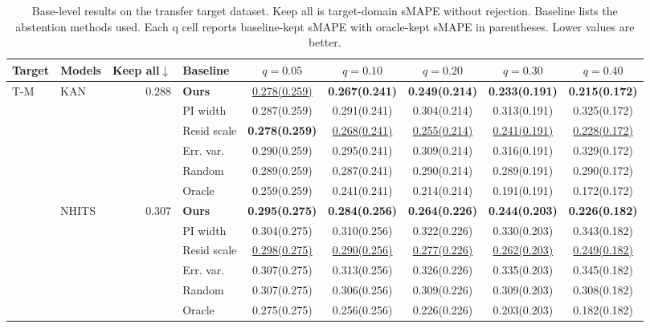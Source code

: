 \begin{table}[t]
\centering
\scriptsize
\setlength{\tabcolsep}{2pt}
\renewcommand{\arraystretch}{0.90}
\caption{Base-level results on the transfer target dataset. Keep all is target-domain sMAPE without rejection. Baseline lists the abstention methods used. Each q cell reports baseline-kept sMAPE with oracle-kept sMAPE in parentheses. Lower values are better.}
\label{tab:online-reject-option}
\begin{tabular}{@{}llrlccccc@{}}
\toprule
Target & Models & Keep all$\downarrow$ & Baseline & $q=0.05$ & $q=0.10$ & $q=0.20$ & $q=0.30$ & $q=0.40$ \\
\midrule
T-M & KAN & 0.288 & \textbf{Ours} & \underline{0.278(0.259)} & \textbf{0.267(0.241)} & \textbf{0.249(0.214)} & \textbf{0.233(0.191)} & \textbf{0.215(0.172)} \\
 &  &  & PI width & 0.287(0.259) & 0.291(0.241) & 0.304(0.214) & 0.313(0.191) & 0.325(0.172) \\
 &  &  & Resid scale & \textbf{0.278(0.259)} & \underline{0.268(0.241)} & \underline{0.255(0.214)} & \underline{0.241(0.191)} & \underline{0.228(0.172)} \\
 &  &  & Err. var. & 0.290(0.259) & 0.295(0.241) & 0.309(0.214) & 0.316(0.191) & 0.329(0.172) \\
\cmidrule(lr){4-9}
 &  &  & Random & 0.289(0.259) & 0.287(0.241) & 0.290(0.214) & 0.289(0.191) & 0.290(0.172) \\
 &  &  & Oracle & 0.259(0.259) & 0.241(0.241) & 0.214(0.214) & 0.191(0.191) & 0.172(0.172) \\
\cmidrule(lr){2-9}
 & NHITS & 0.307 & \textbf{Ours} & \textbf{0.295(0.275)} & \textbf{0.284(0.256)} & \textbf{0.264(0.226)} & \textbf{0.244(0.203)} & \textbf{0.226(0.182)} \\
 &  &  & PI width & 0.304(0.275) & 0.310(0.256) & 0.322(0.226) & 0.330(0.203) & 0.343(0.182) \\
 &  &  & Resid scale & \underline{0.298(0.275)} & \underline{0.290(0.256)} & \underline{0.277(0.226)} & \underline{0.262(0.203)} & \underline{0.249(0.182)} \\
 &  &  & Err. var. & 0.307(0.275) & 0.313(0.256) & 0.326(0.226) & 0.335(0.203) & 0.345(0.182) \\
\cmidrule(lr){4-9}
 &  &  & Random & 0.307(0.275) & 0.306(0.256) & 0.309(0.226) & 0.309(0.203) & 0.308(0.182) \\
 &  &  & Oracle & 0.275(0.275) & 0.256(0.256) & 0.226(0.226) & 0.203(0.203) & 0.182(0.182) \\

\end{tabular}
\end{table}
